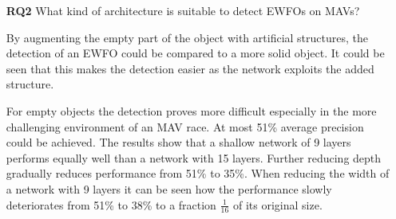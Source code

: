 \begin{enumerate}
	\item[\textbf{RQ2}]What kind of architecture is suitable to detect \acp{EWFO} on \acp{MAV}?
	
	By augmenting the empty part of the object with artificial structures, the detection of an \ac{EWFO} could be compared to a more solid object. It could be seen that this makes the detection easier as the network exploits the added structure. 
	
	For empty objects the detection proves more difficult especially in the more challenging environment of an \ac{MAV} race. At most 51\% average precision could be achieved. The results show that a shallow network of 9 layers performs equally well than a network with 15 layers. Further reducing depth gradually reduces performance from 51\% to 35\%. When reducing the width of a network with 9 layers it can be seen how the performance slowly deteriorates from 51\% to 38\%  to a fraction $\frac{1}{16}$ of its original size. 
		
\end{enumerate}



